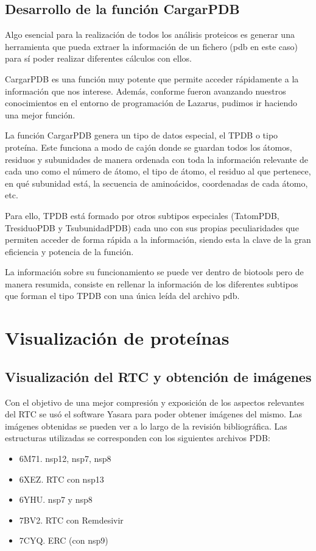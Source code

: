 \documentclass[a4paper,11pt]{report}
\begin{document}
 \subsection{Desarrollo de la función CargarPDB}
 Algo esencial para la realización de todos los análisis proteicos es generar una herramienta que pueda extraer la información de un fichero (pdb en este caso) para sí poder realizar diferentes cálculos con ellos.
 
CargarPDB es una función muy potente que permite acceder rápidamente a la información que nos interese. Además, conforme fueron avanzando nuestros conocimientos en el entorno de programación de Lazarus, pudimos ir haciendo una mejor función.

La función CargarPDB genera un tipo de datos especial, el TPDB o tipo proteína. Este funciona a modo de cajón donde se guardan todos los átomos, residuos y subunidades de manera ordenada con toda la información relevante de cada uno  como el número de átomo,  el tipo de átomo, el residuo al que pertenece, en qué subunidad está, la secuencia de aminoácidos, coordenadas de cada átomo, etc.

Para ello, TPDB está formado por otros subtipos especiales (TatomPDB, TresiduoPDB y TsubunidadPDB) cada uno con sus propias peculiaridades que permiten acceder de forma rápida a la información, siendo esta la clave de la gran eficiencia y potencia de la función.

La información sobre su funcionamiento se puede ver dentro de biotools pero de manera resumida, consiste en rellenar la información de los diferentes subtipos que forman el tipo TPDB con una única leída del archivo pdb.

 \section{Visualización de proteínas}
 \subsection{Visualización del RTC y obtención de imágenes}
 Con el objetivo de una mejor compresión y exposición de los aspectos relevantes del RTC se usó el software Yasara para poder obtener imágenes del mismo. Las imágenes obtenidas se pueden ver a lo largo de la revisión bibliográfica. Las estructuras utilizadas se corresponden con los siguientes archivos PDB:
 
\begin{itemize}
	\item 6M71. nsp12, nsp7, nsp8
	\item 6XEZ. RTC con nsp13
	\item 6YHU. nsp7 y nsp8
	\item 7BV2. RTC con Remdesivir
	\item 7CYQ. ERC (con nsp9)
\end{itemize}
\end{document}
